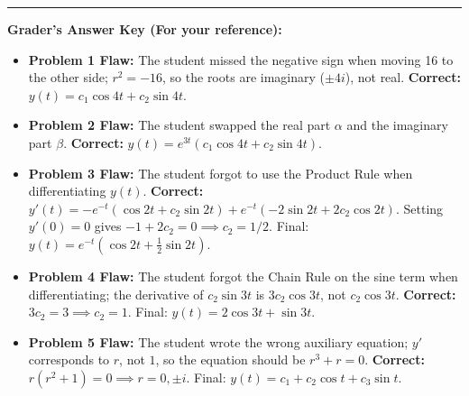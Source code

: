 \documentclass[11pt]{article}
\begin{document}
\vspace{1cm}
\hrule
\vspace{0.5cm}
\textbf{Grader's Answer Key (For your reference):}
\begin{itemize}
    \item \textbf{Problem 1 Flaw:} The student missed the negative sign when moving 16 to the other side; $r^2 = -16$, so the roots are imaginary ($\pm 4i$), not real. \textbf{Correct:} $y(t) = c_1 \cos 4t + c_2 \sin 4t$.
    \item \textbf{Problem 2 Flaw:} The student swapped the real part $\alpha$ and the imaginary part $\beta$. \textbf{Correct:} $y(t) = e^{3t}(c_1 \cos 4t + c_2 \sin 4t)$.
    \item \textbf{Problem 3 Flaw:} The student forgot to use the Product Rule when differentiating $y(t)$. \textbf{Correct:} $y'(t) = -e^{-t}(\cos 2t + c_2 \sin 2t) + e^{-t}(-2 \sin 2t + 2c_2 \cos 2t)$. Setting $y'(0)=0$ gives $-1 + 2c_2 = 0 \implies c_2 = 1/2$. Final: $y(t) = e^{-t}(\cos 2t + \frac{1}{2}\sin 2t)$.
    \item \textbf{Problem 4 Flaw:} The student forgot the Chain Rule on the sine term when differentiating; the derivative of $c_2 \sin 3t$ is $3c_2 \cos 3t$, not $c_2 \cos 3t$. \textbf{Correct:} $3c_2 = 3 \implies c_2 = 1$. Final: $y(t) = 2 \cos 3t + \sin 3t$.
    \item \textbf{Problem 5 Flaw:} The student wrote the wrong auxiliary equation; $y'$ corresponds to $r$, not $1$, so the equation should be $r^3 + r = 0$. \textbf{Correct:} $r(r^2+1)=0 \implies r=0, \pm i$. Final: $y(t) = c_1 + c_2 \cos t + c_3 \sin t$.
\end{itemize}
\end{document}
